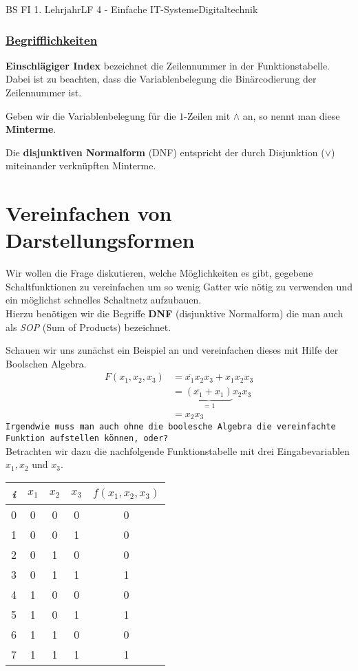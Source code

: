 \documentclass[11pt,twocolumn,oneside,openany,headings=optiontotoc,11pt,numbers=noenddot]{article}
\begin{document}
	\begin{worksheet}{BS FI 1. Lehrjahr}{LF 4 - Einfache IT-Systeme}{Digitaltechnik}
		\setcounter{section}{6}
		\setcounter{page}{16}
		\subsubsection*{\underline{Begrifflichkeiten}}
		\textbf{Einschlägiger Index} bezeichnet die Zeilennummer in der Funktionstabelle. Dabei ist zu beachten, dass die Variablenbelegung die Binärcodierung der Zeilennummer ist.\\
		\par\noindent
		Geben wir die Variablenbelegung für die \(1\)-Zeilen mit \(\wedge\) an, so nennt man diese \textbf{Minterme}.\\
		\par\noindent
		Die \textbf{disjunktiven Normalform} (DNF) entspricht der durch Disjunktion (\(\vee\)) miteinander verknüpften Minterme.
		\section{Vereinfachen von Darstellungsformen}
		Wir wollen die Frage diskutieren, welche Möglichkeiten es gibt, gegebene Schaltfunktionen zu vereinfachen um so wenig Gatter wie nötig zu verwenden und ein möglichst schnelles Schaltnetz aufzubauen.\\
		Hierzu benötigen wir die Begriffe \textbf{DNF} (disjunktive Normalform)  die man auch als \textit{SOP} (Sum of Products) bezeichnet.\\
		\par\noindent
		Schauen wir uns zunächst ein Beispiel an und vereinfachen dieses mit Hilfe der Boolschen Algebra.
		\begin{align*}
			F(x_1,x_2,x_3) &= \overline{x_1}x_2x_3 + x_1x_2x_3\\
			&= \underbrace{(\overline{x_1} + x_1)}_{=1}x_2x_3\\
			&= x_2x_3
		\end{align*}
		\texttt{Irgendwie muss man auch ohne die boolesche Algebra die vereinfachte Funktion aufstellen können, oder?}\\
		Betrachten wir dazu die nachfolgende Funktionstabelle mit drei Eingabevariablen \(x_1, x_2\) und \(x_3\).
		\begin{center}
			\begin{tabular}{|c|ccc|c|}
				\hline
				\textit{i} & \(x_1\) & \(x_2\) & \(x_3\) & \(f(x_1,x_2,x_3)\)\\
				\hline
				0 & 0 & 0 & 0 & 0\\
				\hline
				1 & 0 & 0 & 1 & 0\\
				\hline
				2 & 0 & 1 & 0 & 0\\
				\hline
				3 & 0 & 1 & 1 & 1\\
				\hline
				4 & 1 & 0 & 0 & 0\\
				\hline
				5 & 1 & 0 & 1 & 1\\
				\hline
				6 & 1 & 1 & 0 & 0\\
				\hline
				7 & 1 & 1 & 1 & 1\\
				\hline
			\end{tabular}
		\end{center}

\end{worksheet}
\end{document}
